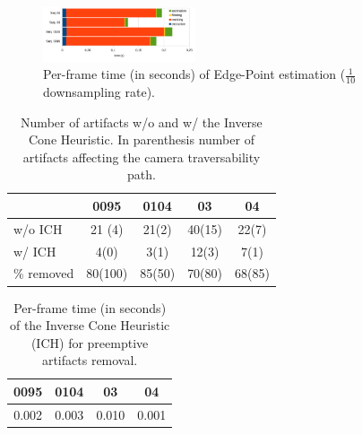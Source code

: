 
 \begin{figure}[t]
  \centering
  \includegraphics[width=0.4\textwidth]{././img//risultatitiming.pdf}
  \caption{Per-frame time (in seconds) of Edge-Point estimation ($\frac{1}{10}$ downsampling rate).}
   \label{tab:timing}
\end{figure}
%

  

\begin{table}[t]
  \caption{Number of artifacts w/o and w/ the Inverse Cone Heuristic. In parenthesis number of artifacts affecting the camera traversability path.}
  \footnotesize
   \label{tab:numArtifacts}
   \centering
   \begin{tabular}{p{}cccc}
   \toprule 
                               & 0095  & 0104& 03 & 04   \\
   \hline
   w/o ICH                 & 21 (4) &21(2)& 40(15)& 22(7)\\
   w/  ICH                    & 4(0) &3(1)& 12(3)& 7(1)\\
 \% removed                 & 80(100) &85(50)& 70(80)& 68(85)\\
    \bottomrule
  \end{tabular}
  \end{table}
  



\begin{table}[t]
  \caption{Per-frame time (in seconds) of the Inverse Cone Heuristic (ICH) for preemptive artifacts removal.}
  \footnotesize
   \label{tab:inverseTiming}
   \centering
   \begin{tabular}{cccc}
   \toprule  
     0095  & 0104&03 & 04     \\
   \hline
     0.002 & 0.003& 0.010 & 0.001  \\
    \bottomrule
  \end{tabular}
  \end{table} 


